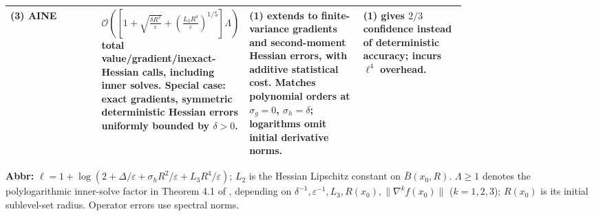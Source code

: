 \begin{table}[tp]
\begin{threeparttable}
\begin{tabularx}{\linewidth}{@{}>{\raggedright\arraybackslash}p{0.20\linewidth}>{\raggedright\arraybackslash}p{0.32\linewidth}>{\raggedright\arraybackslash}p{0.25\linewidth}>{\raggedright\arraybackslash}X@{}}
\midrule
\textbf{(3)} AINE \citep[Corollary 4.1]{stdChen2026v3} & $\mathcal{O}\!\left(\left[1+\sqrt{\frac{\delta R^2}{\varepsilon}}+\left(\frac{L_3R^4}{\varepsilon}\right)^{1/5}\right]\Lambda\right)$ total value/gradient/inexact-Hessian calls, including inner solves. Special case: exact gradients, symmetric deterministic Hessian errors uniformly bounded by $\delta>0$. & \textbf{(1)} extends to finite-variance gradients and second-moment Hessian errors, with additive statistical cost. Matches polynomial orders at $\sigma_g=0$, $\sigma_h=\delta$; logarithms omit initial derivative norms. & \textbf{(1)} gives $2/3$ confidence instead of deterministic accuracy; incurs $\ell^4$ overhead. \\
\bottomrule
\end{tabularx}
\begin{tablenotes}[flushleft]\footnotesize
\item[] \textbf{Abbr:} $\ell=1+\log(2+\Delta/\varepsilon+\sigma_hR^2/\varepsilon+L_3R^4/\varepsilon)$; $L_2$ is the Hessian Lipschitz constant on $\bar B(x_0,R)$. $\Lambda\ge1$ denotes the polylogarithmic inner-solve factor in Theorem 4.1 of \citep{stdChen2026v3}, depending on $\delta^{-1},\varepsilon^{-1},L_3,R(x_0),\|\nabla^k f(x_0)\|$ ($k=1,2,3$); $R(x_0)$ is its initial sublevel-set radius. Operator errors use spectral norms.
\end{tablenotes}
\end{threeparttable}
\end{table}
\clearpage
